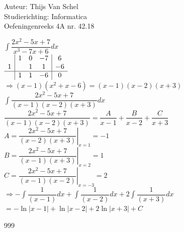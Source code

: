 \documentclass[a4paper]{article}
\newcommand{\dint}{\displaystyle\int}
\begin{document}
  
\noindent \large Auteur: Thijs Van Schel \\
\noindent \large Studierichting: Informatica\\
\noindent \large Oefeningenreeks 4A nr. 42.18\\

\medskip

\normalsize

$\dint \dfrac{2x^2-5x+7}{x^3-7x+6}dx$\\

$\begin{array}{c|ccc|c}
  & 1 & 0 & -7 & 6 \\
1 & & 1 & 1 & -6 \\
\hline
  & 1 & 1 & -6 & 0
\end{array}$\\

$\Rightarrow (x-1)(x^2+x-6) = (x-1)(x-2)(x+3)$\\

$\dint \dfrac{2x^2-5x+7}{(x-1)(x-2)(x+3)}dx$\\

$\dfrac{2x^2-5x+7}{(x-1)(x-2)(x+3)}=\dfrac{A}{x-1}+\dfrac{B}{x-2}+\dfrac{C}{x+3}$\\

$A = \left . \dfrac{2x^2-5x+7}{(x-2)(x+3)}\right |_{x=1}=-1$ \\

$B = \left . \dfrac{2x^2-5x+7}{(x-1)(x+3)}\right |_{x=2}=1$\\

$C = \left . \dfrac{2x^2-5x+7}{(x-1)(x-2)} \right |_{x=-3}=2$\\

$\Rightarrow -\dint \dfrac{1}{(x-1)}dx + \dint \dfrac{1}{(x-2)}dx + 2\dint \dfrac{1}{(x+3)}dx$\\

$= -\ln|x-1|+\ln|x-2|+2\ln|x+3|+C$

\begin{thebibliography}{999}
\end{thebibliography}
\end{document}
